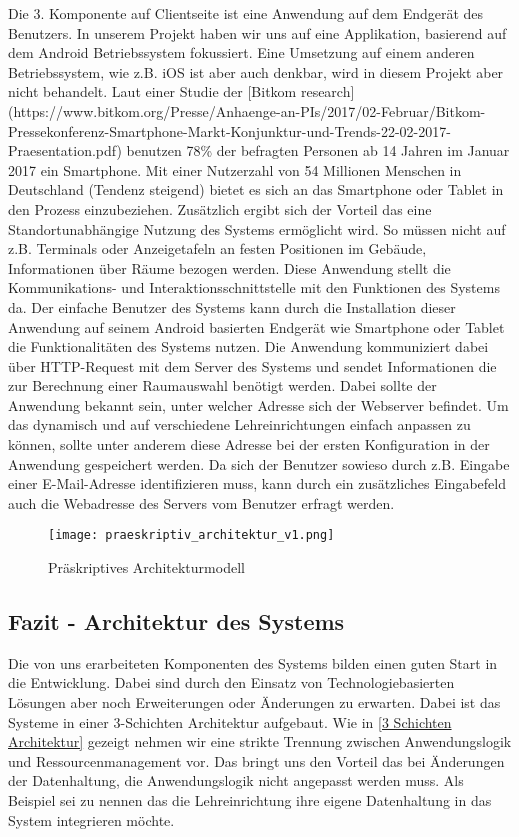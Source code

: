 Die 3. Komponente auf Clientseite ist eine Anwendung auf dem Endgerät des
Benutzers. In unserem Projekt haben wir uns auf eine Applikation, basierend auf
dem Android Betriebssystem fokussiert. Eine Umsetzung auf einem anderen
Betriebssystem, wie z.B. iOS ist aber auch denkbar, wird in diesem Projekt aber
nicht behandelt.
Laut einer Studie der [Bitkom research](https://www.bitkom.org/Presse/Anhaenge-an-PIs/2017/02-Februar/Bitkom-Pressekonferenz-Smartphone-Markt-Konjunktur-und-Trends-22-02-2017-Praesentation.pdf) 
benutzen 78\% der befragten Personen ab 14 Jahren im Januar 2017 ein Smartphone.
Mit einer Nutzerzahl von 54 Millionen Menschen in Deutschland (Tendenz steigend)
bietet es sich an das Smartphone oder Tablet in den Prozess einzubeziehen.
Zusätzlich ergibt sich der Vorteil das eine Standortunabhängige Nutzung des
Systems ermöglicht wird. So müssen nicht auf z.B. Terminals oder Anzeigetafeln
an festen Positionen im Gebäude, Informationen über Räume bezogen werden. 
Diese Anwendung stellt die Kommunikations-  und Interaktionsschnittstelle mit
den Funktionen des Systems da. Der einfache Benutzer des Systems kann durch die
Installation dieser Anwendung auf seinem Android basierten Endgerät wie \zB
Smartphone oder Tablet die Funktionalitäten des Systems nutzen. Die Anwendung
kommuniziert dabei über HTTP-Request mit dem Server des Systems und sendet
Informationen die zur Berechnung einer Raumauswahl benötigt werden.
Dabei sollte der Anwendung bekannt sein, unter welcher Adresse sich der
Webserver befindet. Um das dynamisch und auf verschiedene Lehreinrichtungen
einfach anpassen zu können, sollte unter anderem diese Adresse bei der ersten
Konfiguration in der Anwendung gespeichert werden. Da sich der Benutzer sowieso
durch z.B. Eingabe einer E-Mail-Adresse identifizieren muss, kann durch ein
zusätzliches Eingabefeld auch die Webadresse des Servers vom Benutzer erfragt
werden.

\begin{figure}
	\centering
	\texttt{[image: praeskriptiv\_architektur\_v1.png]}
	\caption{Präskriptives Architekturmodell}
\end{figure}

\subsection{Fazit - Architektur des Systems}
\label{Fazit_Architektur_des_Systems}

Die von uns erarbeiteten Komponenten des Systems bilden einen guten Start in
die Entwicklung. Dabei sind durch den Einsatz von Technologiebasierten Lösungen
aber noch Erweiterungen oder Änderungen zu erwarten.
Dabei ist das Systeme in einer 3-Schichten Architektur aufgebaut.
Wie in \ref{3 Schichten Architektur} gezeigt nehmen wir eine strikte Trennung
zwischen Anwendungslogik und Ressourcenmanagement vor. Das bringt uns den
Vorteil das bei Änderungen der Datenhaltung, die Anwendungslogik nicht
angepasst werden muss. Als Beispiel sei zu nennen das die Lehreinrichtung ihre
eigene Datenhaltung in das System integrieren möchte.

